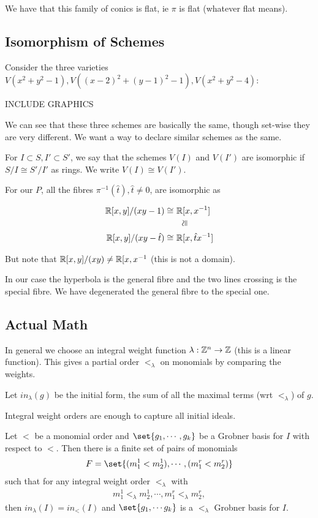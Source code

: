 We have that this family of conics is flat, ie $\pi$ is flat (whatever flat means).

\subsection{Isomorphism of Schemes}

Consider the three varieties $V(x^2 + y^2 - 1), V((x-2)^2 + (y-1)^2 - 1),V(x^2 + y^2 - 4)$:

INCLUDE GRAPHICS

We can see that these three schemes are basically the same, though set-wise they are very different. We want a way to declare similar schemes as the same.

\begin{definition}
For $I \subset S, I' \subset S'$, we say that the schemes $V(I)$ and $V(I') $ are isomorphic if $S / I \cong S'/I'$ as rings. We write $V(I) \cong V(I')$.  
\end{definition}

For our $P$, all the fibres $\pi^{-1} (\hat{t}), \hat{t} \neq 0 $, are isomorphic as

\begin{align*}
    \R [ x,y] / (xy - 1) \cong \,\, &\R [x,x^{-1}]\\
    & \,\,\,\, \rotatebox{90}{$\cong$}\\
    \R [ x,y] / (xy - \hat{t}) \cong \,\,  &\R [x,\hat{t} x^{-1}]
\end{align*}

But note that $\mathbb{R}[x,y] / (xy) \neq \mathbb{R}[x,x^{-1}$ (this is not a domain).

In our case the hyperbola is the general fibre and the two lines crossing is the special fibre. We have degenerated the general fibre to the special one.

\subsection{Actual Math}

In general we choose an integral weight function $\lambda : \mathbb{Z}^n  \to \mathbb{Z}$ (this is a linear function). This gives a partial order $<_\lambda$ on monomials by comparing the weights.

Let $in_\lambda(g) $ be the initial form, the sum of all the maximal terms (wrt $<_\lambda$) of $g$.

Integral weight orders are enough to capture all initial ideals.

\begin{theorem}
Let $<$ be a monomial order and $\set{ g_1, \cdots, g_k }$ be a Grobner basis for $I$ with respect to $<$. Then there is a finite set of pairs of monomials
\begin{align*}
    F = \set{ (m_1^1 < m_2^1 ) , \cdots, ( m_1^r < m_2^r ) }
\end{align*}
such that for any integral weight order $<_\lambda$ with 
\begin{align*}
m_1^1 <_\lambda m_2^1, \cdots , m_1^r <_\lambda m_2^r,
\end{align*}
then $in_\lambda (I) = in_< (I)$ and $\set{g_1, \cdots g_k}$ is a $<_\lambda $ Grobner basis for $I$.
\end{theorem}

